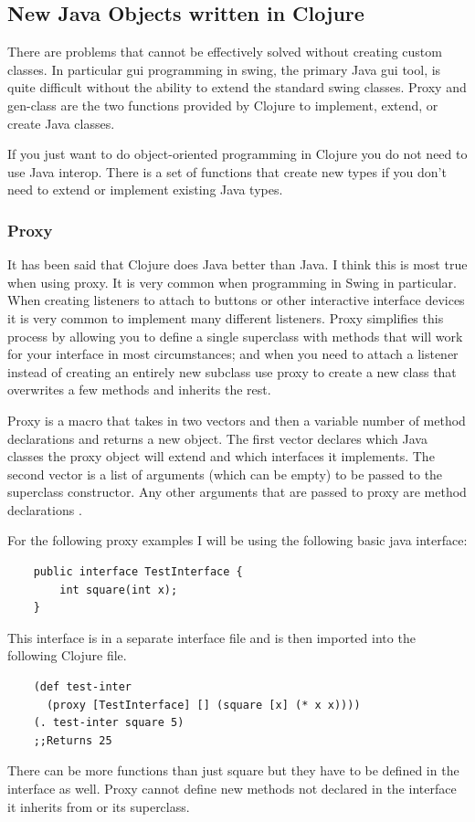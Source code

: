\documentclass[12pt]{article}
\begin{document}
	\subsection{New Java Objects written in Clojure}
	There are problems that cannot be effectively solved without creating custom classes. In particular gui programming in swing, the primary Java gui tool, is quite difficult without the ability to extend the standard swing classes. Proxy and gen-class are the two functions provided by Clojure to implement, extend, or create Java classes. 
	
	If you just want to do object-oriented programming in Clojure you do not need to use Java interop. There is a set of functions that create new types if you don't need to extend or implement existing Java types.
	
	\subsubsection{Proxy}
	It has been said that Clojure does Java better than Java\cite{halloway:better}. I think this is most true when using proxy. It is very common when programming in Swing in particular. When creating listeners to attach to buttons or other interactive interface devices it is very common to implement many different listeners. Proxy simplifies this process by allowing you to define a single superclass with methods that will work for your interface in most circumstances; and when you need to attach a listener instead of creating an entirely new subclass use proxy to create a new class that overwrites a few methods and inherits the rest. 
	
	Proxy is a macro that takes in two vectors and then a variable number of method declarations and returns a new object. The first vector declares which Java classes the proxy object will extend and which interfaces it implements. The second vector is a list of arguments (which can be empty) to be passed to the superclass constructor. Any other arguments that are passed to proxy are method declarations \cite{cloj:interop}. 
	
	For the following proxy examples I will be using the following basic java interface:
	
	\begin{verbatim}
	public interface TestInterface {
		int square(int x);
	}
	\end{verbatim}
	This interface is in a separate interface file and is then imported into the following Clojure file.
	\begin{verbatim}
	(def test-inter 
	  (proxy [TestInterface] [] (square [x] (* x x))))
	(. test-inter square 5)
	;;Returns 25
	\end{verbatim}
	There can be more functions than just square but they have to be defined in the interface as well. Proxy cannot define new methods not declared in the interface it inherits from or its superclass.
	
\end{document}
